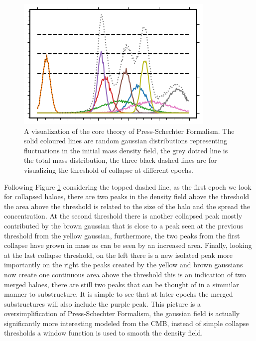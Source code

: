 \begin{figure}[h]
	\centering
	\includegraphics[width = \linewidth]{Figures/Chapter1/PS_Cartoon.png}
    \caption{A visualization of the core theory of Press-Schechter Formalism. The solid coloured lines are random gaussian distributions representing fluctuations in the initial mass density field, the grey dotted line is the total mass distribution, the three black dashed lines are for visualizing the threshold of collapse at different epochs.}
	\label{fig:PS_Cartoon}
\end{figure}

Following Figure \ref{fig:PS_Cartoon} considering the topped dashed line, as the first epoch we look for collapsed haloes, there are two peaks in the density field above the threshold the area above the threshold is related to the size of the halo and the spread the concentration. At the second threshold there is another collapsed peak mostly contributed by the brown gaussian that is close to a peak seen at the previous threshold from the yellow gaussian, furthermore, the two peaks from the first collapse have grown in mass as can be seen by an increased area. Finally, looking at the last collapse threshold,  on the left there is a new isolated peak more importantly on the right the peaks created by the yellow and brown gaussians now create one continuous area above the threshold this is an indication of two merged haloes, there are still two peaks that can be thought of in a simmilar manner to substructure. It is simple to see that at later epochs the merged substructures will also include the purple peak. This picture is a oversimplification of Press-Schechter Formalism, the gaussian field is actually significantly more interesting modeled from the CMB, instead of simple collapse thresholds a window function is used to smooth the density field. 

